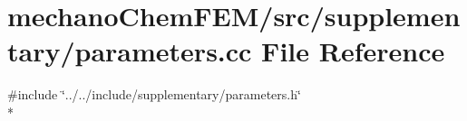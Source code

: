 \section{mechano\-Chem\-F\-E\-M/src/supplementary/parameters.cc File Reference}
\label{parameters_8cc}
{\ttfamily \#include \char`\"{}../../include/supplementary/parameters.\-h\char`\"{}}\\*
